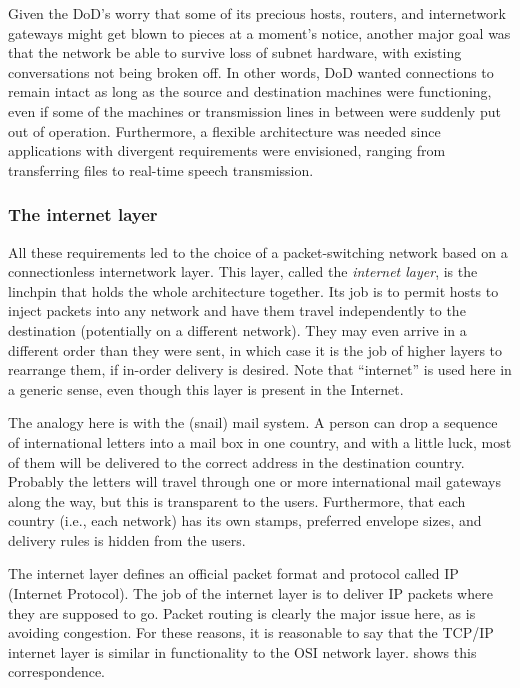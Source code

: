 Given the DoD's worry that some of its precious hosts, routers, and
internetwork gateways might get blown to pieces at a moment's notice,
another major goal was that the network be able to survive loss of
subnet hardware, with existing conversations not being broken off. In
other words, DoD wanted connections to remain intact as long as the
source and destination machines were functioning, even if some of the
machines or transmission lines in between were suddenly put out of
operation. Furthermore, a flexible architecture was needed since
applications with divergent requirements were envisioned, ranging from
transferring files to real-time speech transmission.


\subsubsection{The internet layer}

All these requirements led to the choice of a packet-switching network
based on a connectionless internetwork layer. This layer, called the
\emph{internet layer}, is the linchpin that holds the whole architecture
together. Its job is to permit hosts to inject packets into any network
and have them travel independently to the destination (potentially on a
different network). They may even arrive in a different order than they
were sent, in which case it is the job of higher layers to rearrange
them, if in-order delivery is desired. Note that ``internet'' is used
here in a generic sense, even though this layer is present in the
Internet.

The analogy here is with the (snail) mail system. A person can drop a
sequence of international letters into a mail box in one country, and
with a little luck, most of them will be delivered to the correct
address in the destination country. Probably the letters will travel
through one or more international mail gateways along the way, but this
is transparent to the users. Furthermore, that each country (i.e., each
network) has its own stamps, preferred envelope sizes, and delivery
rules is hidden from the users.

The internet layer defines an official packet format and protocol called
{IP} ({Internet Protocol}). The job of the internet layer is to deliver
IP packets where they are supposed to go. Packet routing is clearly the
major issue here, as is avoiding congestion. For these reasons, it is
reasonable to say that the TCP/IP internet layer is similar in
functionality to the OSI network layer.
 shows this correspondence.


